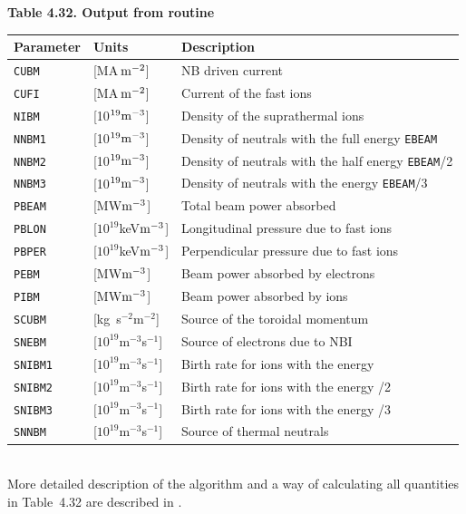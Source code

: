 \noindent
{\bf Table 4.32. Output from  routine}\\[2ex]
\begin{tabular}{| l l l |}					\hline
\bf Parameter	&\bf Units	&\bf Description\\		\hline
{\tt CUBM}	&[MA$\,\rm m^{-2}$]	& NB driven current\\
{\tt CUFI}	&[MA$\,\rm m^{-2}$]	& Current of the fast ions\\
{\tt NIBM}	&[10$^{19}{\rm m}^{-3}$]
		&Density of the suprathermal ions\\
{\tt NNBM1}	&[10$^{19}{\rm m}^{-3}$]	
		&Density of neutrals with the full energy {\tt EBEAM}\\ 
{\tt NNBM2}	&[10$^{19}{\rm m}^{-3}$]
		&Density of neutrals with the half energy {\tt EBEAM}/2\\
{\tt NNBM3}	&[10$^{19}{\rm m}^{-3}$]
		& Density of neutrals with the energy {\tt EBEAM}/3\\
{\tt PBEAM}	&[MW${\rm m}^{-3}$]& Total beam power absorbed\\
{\tt PBLON}	&[$10^{19}$keV${\rm m}^{-3}$]	
		& Longitudinal pressure due to fast ions\\
{\tt PBPER}	&[$10^{19}$keV${\rm m}^{-3}$]	
		& Perpendicular pressure due to fast ions\\
{\tt PEBM}	&[MW${\rm m}^{-3}$]& Beam power absorbed by electrons\\
{\tt PIBM}	&[MW${\rm m}^{-3}$]& Beam power absorbed by ions\\
{\tt SCUBM}	&[kg~s$^{-2}$m$^{-2}$]	
		& Source of the toroidal momentum\\
{\tt SNEBM}	&[$10^{19}$m$^{-3}$s$^{-1}$]	
		& Source of electrons due to NBI\\
{\tt SNIBM1} &$[10^{19}$m$^{-3}$s$^{-1}]$ 
		& Birth rate for ions with the energy \twd{EBEAM}\\
{\tt SNIBM2} &$[10^{19}$m$^{-3}$s$^{-1}]$ 
		& Birth rate for ions with the energy \twd{EBEAM}/2\\
{\tt SNIBM3} &$[10^{19}$m$^{-3}$s$^{-1}]$ 
		& Birth rate for ions with the energy \twd{EBEAM}/3\\
{\tt SNNBM}	&[$10^{19}$m$^{-3}$s$^{-1}$]
		& Source of thermal neutrals\\			\hline
\end{tabular}\\[15pt]
More detailed description of the algorithm and a way of calculating all
quantities in Table~4.32 are described in \cite{Pole}. 

\vfill\eject
